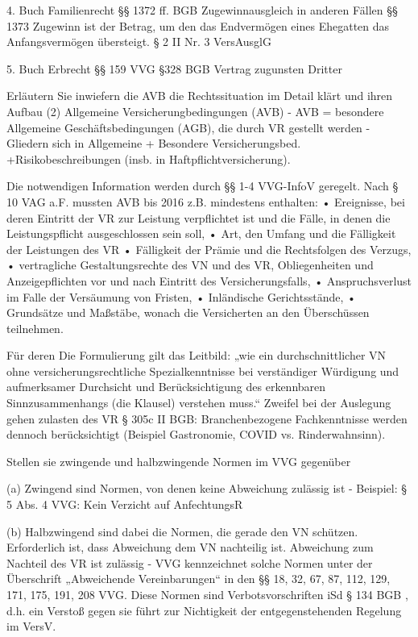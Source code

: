 4. Buch Familienrecht
§§ 1372 ff. BGB Zugewinnausgleich in anderen Fällen
§§ 1373 Zugewinn ist der Betrag, um den das Endvermögen eines Ehegatten das Anfangsvermögen übersteigt.
§ 2 II Nr. 3 VersAusglG

5. Buch Erbrecht
§§ 159 VVG
§328 BGB Vertrag zugunsten Dritter


Erläutern Sie inwiefern die AVB die Rechtssituation im Detail klärt und ihren Aufbau
(2) Allgemeine Versicherungbedingungen (AVB)
- AVB = besondere Allgemeine Geschäftsbedingungen (AGB), die durch VR
gestellt werden
- Gliedern sich in Allgemeine + Besondere Versicherungsbed.
+Risikobeschreibungen (insb. in Haftpflichtversicherung).

Die notwendigen Information werden durch §§ 1-4 VVG-InfoV geregelt.
Nach § 10 VAG a.F. mussten AVB bis 2016 z.B. mindestens enthalten:
• Ereignisse, bei deren Eintritt der VR zur Leistung verpflichtet ist und die Fälle,
in denen die Leistungspflicht ausgeschlossen sein soll,
• Art, den Umfang und die Fälligkeit der Leistungen des VR
• Fälligkeit der Prämie und die Rechtsfolgen des Verzugs,
• vertragliche Gestaltungsrechte des VN und des VR, Obliegenheiten und
Anzeigepflichten vor und nach Eintritt des Versicherungsfalls,
• Anspruchsverlust im Falle der Versäumung von Fristen,
• Inländische Gerichtsstände,
• Grundsätze und Maßstäbe, wonach die Versicherten an den Überschüssen
teilnehmen.

Für deren Die Formulierung gilt das Leitbild: 
„wie ein durchschnittlicher VN ohne versicherungsrechtliche
Spezialkenntnisse bei verständiger Würdigung und aufmerksamer
Durchsicht und Berücksichtigung des erkennbaren
Sinnzusammenhangs (die Klausel) verstehen muss.“
Zweifel bei der Auslegung gehen zulasten des VR § 305c II BGB:
Branchenbezogene Fachkenntnisse werden dennoch berücksichtigt 
(Beispiel Gastronomie, COVID vs. Rinderwahnsinn).


Stellen sie zwingende und halbzwingende Normen im VVG gegenüber

(a) Zwingend sind Normen, von denen keine Abweichung
zulässig ist
- Beispiel: § 5 Abs. 4 VVG: Kein Verzicht auf AnfechtungsR

(b) Halbzwingend sind dabei die Normen, die gerade den
VN schützen. Erforderlich ist, dass Abweichung dem VN
nachteilig ist. Abweichung zum Nachteil des VR ist
zulässig
- VVG kennzeichnet solche Normen unter der Überschrift
„Abweichende Vereinbarungen“ in den §§ 18, 32, 67, 87,
112, 129, 171, 175, 191, 208 VVG.
Diese Normen sind Verbotsvorschriften iSd § 134 BGB ,
d.h. ein Verstoß gegen sie führt zur Nichtigkeit der
entgegenstehenden Regelung im VersV.


